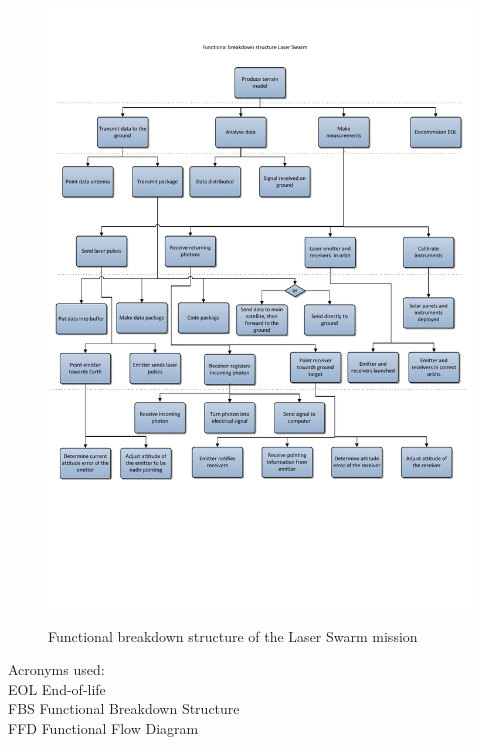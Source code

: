 \begin{figure}
\begin{center}
\includegraphics[trim = 0mm 50mm 0mm 0mm, clip, scale=0.7]{img/pic_FBS.pdf}
\label{pic_FBS}
\caption{Functional breakdown structure of the Laser Swarm mission}
\end{center}
\end{figure}


Acronyms used:\\
EOL End-of-life\\
FBS Functional Breakdown Structure\\
FFD Functional Flow Diagram


